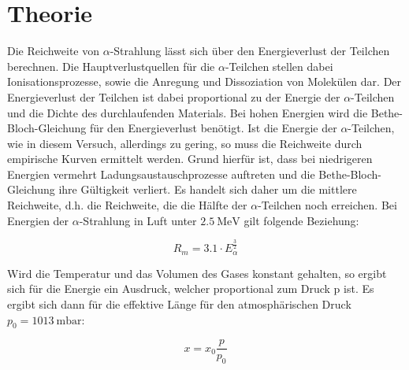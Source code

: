 \section{Theorie}
\label{sec:Theorie}

Die Reichweite von $\alpha$-Strahlung lässt sich über den Energieverlust der Teilchen berechnen.
Die Hauptverlustquellen für die $\alpha$-Teilchen stellen dabei Ionisationsprozesse, sowie die Anregung und Dissoziation von Molekülen dar.
Der Energieverlust der Teilchen ist dabei proportional zu der Energie der $\alpha$-Teilchen und die Dichte des durchlaufenden Materials.
Bei hohen Energien wird die Bethe-Bloch-Gleichung für den Energieverlust benötigt.
Ist die Energie der $\alpha$-Teilchen, wie in diesem Versuch, allerdings zu gering, so muss die Reichweite durch empirische Kurven ermittelt werden.
Grund hierfür ist, dass bei niedrigeren Energien vermehrt Ladungsaustauschprozesse auftreten und die Bethe-Bloch-Gleichung ihre Gültigkeit verliert.
Es handelt sich daher um die mittlere Reichweite, d.h. die Reichweite, die die Hälfte der $\alpha$-Teilchen noch erreichen.
Bei Energien der $\alpha$-Strahlung in Luft unter $\SI{2.5}{\mega\electronvolt}$ gilt folgende Beziehung:

\begin{equation}
  R_m = 3.1 \cdot E_{\alpha}^{\frac{3}{2}}
\end{equation}

Wird die Temperatur und das Volumen des Gases konstant gehalten, so ergibt sich für die Energie ein Ausdruck, welcher proportional zum Druck p ist.
Es ergibt sich dann für die effektive Länge für den atmosphärischen Druck $p_0 = \SI{1013}{\milli\bar}$:

\begin{equation}
  x = x_0 \frac{p}{p_0}
\end{equation}
